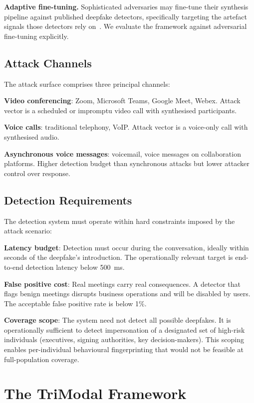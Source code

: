 \documentclass[sigconf,nonacm]{acmart}
\begin{document}
\textbf{Adaptive fine-tuning.} Sophisticated adversaries may fine-tune
their synthesis pipeline against published deepfake detectors,
specifically targeting the artefact signals those detectors rely
on~\cite{liu2024advdf,saha2024adaptive}. We evaluate the framework
against adversarial fine-tuning explicitly.

\subsection{Attack Channels}

The attack surface comprises three principal channels:

\textbf{Video conferencing}: Zoom, Microsoft Teams, Google Meet,
Webex. Attack vector is a scheduled or impromptu video call with
synthesised participants.

\textbf{Voice calls}: traditional telephony, VoIP. Attack vector is a
voice-only call with synthesised audio.

\textbf{Asynchronous voice messages}: voicemail, voice messages on
collaboration platforms. Higher detection budget than synchronous
attacks but lower attacker control over response.

\subsection{Detection Requirements}

The detection system must operate within hard constraints imposed by
the attack scenario:

\textbf{Latency budget}: Detection must occur during the conversation,
ideally within seconds of the deepfake's introduction. The
operationally relevant target is end-to-end detection latency below
500~ms.

\textbf{False positive cost}: Real meetings carry real consequences.
A detector that flags benign meetings disrupts business operations and
will be disabled by users. The acceptable false positive rate is below
1\%.

\textbf{Coverage scope}: The system need not detect all possible
deepfakes. It is operationally sufficient to detect impersonation of a
designated set of high-risk individuals (executives, signing authorities,
key decision-makers). This scoping enables per-individual behavioural
fingerprinting that would not be feasible at full-population coverage.

\section{The TriModal Framework}
\end{document}
